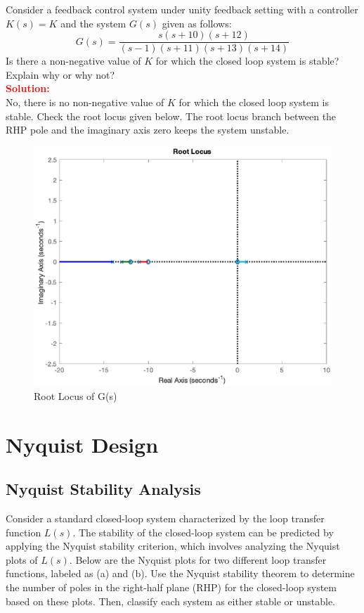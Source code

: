 \documentclass[12pt]{article}
\begin{document}
Consider a feedback control system under unity feedback setting with a controller $K(s)=K$ and the system $G(s)$ given as follows:
\[
G(s)=\frac{s(s+10)(s+12)}{(s-1)(s+11)(s+13)(s+14)}
\]
Is there a non-negative value of $K$ for which the closed loop system is stable? Explain why or why not?\\

\textbf{\textcolor{red}{Solution:}} \\
No, there is no non-negative value of $K$ for which the closed loop system is stable. Check the root locus given below. The root locus branch between the RHP pole and the imaginary axis zero keeps the system unstable. 

\begin{figure}[h!]
    \centering
    \includegraphics[width=0.75\linewidth]{figs/7.7.eps}
    \caption{Root Locus of G(s)}
    \label{fig:prb46}
\end{figure}
\clearpage

\section{Nyquist Design}
\subsection{Nyquist Stability Analysis}

Consider a standard closed-loop system characterized by the loop transfer function $L(s)$. The stability of the closed-loop system can be predicted by applying the Nyquist stability criterion, which involves analyzing the Nyquist plots of $L(s)$. Below are the Nyquist plots for two different loop transfer functions, labeled as (a) and (b). Use the Nyquist stability theorem to determine the number of poles in the right-half plane (RHP) for the closed-loop system based on these plots. Then, classify each system as either stable or unstable.
\end{document}
